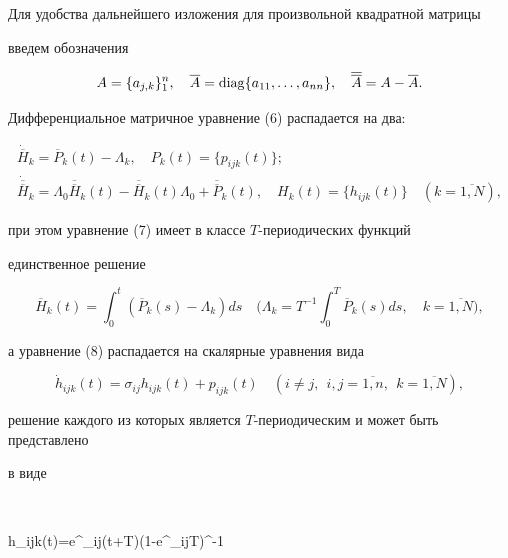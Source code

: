 Для удобства дальнейшего изложения для произвольной квадратной матрицы 


введем обозначения


$$


A= \{a_{j,k} \}_1^n,\quad \overline{A}=


\diag \{a_{11},\dotsc,a_{nn} \},\quad\overline{\overline{A}}=


A-\overline{A}.


$$


Дифференциальное матричное уравнение (6) распадается на два:


\begin{gather}


\Dot{\overline{H}}_k=\overline{P}_k(t)-\Lambda_k,\quad P_k(t)=


\{p_{ijk}(t) \};\\


%


\Dot{\overline{\overline{H}}}_k=\Lambda_0\overline{\overline{H}}_k(t)-


\overline{\overline{H}}_k(t)\Lambda_0+\overline{\overline{P}}_k(t),


\quad H_k(t)= \{h_{ijk}(t) \}\quad (k=\overline{1,N}),


\end{gather}


при этом уравнение (7) имеет в классе $T$-периодических функций 


единственное решение


$$


\overline{H}_k(t)=\int^{t}_{0}(\overline{P}_k(s)-\Lambda_k)ds \quad


\bigg(\Lambda_k=T^{-1}\int^{T}_{0}\overline{P}_k(s)ds,\quad


k=\overline{1,N}\bigg),


$$


а уравнение (8) распадается на скалярные уравнения вида


$$


\Dot{h}_{ijk}(t)=\sigma_{ij}h_{ijk}(t)+p_{ijk}(t) \quad (i\neq j,


\ \ i,j=\overline{1,n}, \ \ k=\overline{1,N}),


$$


решение каждого из которых является $T$-периодическим и может быть представлено 


в виде


$$


h_{ijk}(t)=e^{\sigma_{ij}(t+T)}(1-e^{\sigma_{ij}T})^{-1}


